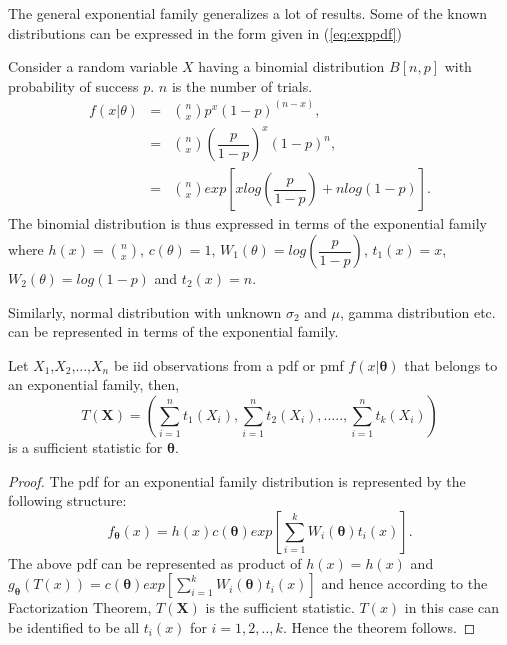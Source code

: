 \documentclass[a4paper,english,12pt]{article}
\newcommand{\bX}{\mathbf{X}}
\newcommand{\btheta}{\boldsymbol{\theta}}
\begin{document}
 The general exponential family generalizes a lot of results. Some of the known distributions can be expressed in the form given in (\ref{eq:exppdf})
 
\begin{exmp}
\par Consider a random variable $X$ having a binomial distribution $B[n,p]$ with probability of success $p$. $n$ is the number of trials. 
\begin{eqnarray}
f(x|\theta) &=& \binom{n}{x}p^{x}(1-p)^{(n-x)},\nonumber \\
&=& \binom{n}{x}\left(\dfrac{p}{1-p}\right)^x(1-p)^n,\nonumber \\
&=& \binom{n}{x}exp\left[x log\left(\dfrac{p}{1-p}\right) + n log(1-p)\right].
\end{eqnarray}
 The binomial distribution is thus expressed in terms of the exponential family where $h(x) = \binom{n}{x}$, $c(\theta) = 1$, $W_1(\theta) = log\left(\dfrac{p}{1-p}\right)$, $t_1(x) = x$, $W_2(\theta) = log(1-p)$ and $t_2(x) = n$.
\end {exmp}
Similarly, normal distribution with unknown $\sigma_2$ and $\mu$, gamma distribution etc. can be represented in terms of the exponential family.
 
\begin{thm}
Let $X_1$,$X_2$,...,$X_n$ be iid observations from a pdf or pmf $f(x|\btheta)$ that belongs to an exponential family, then, 
\begin{equation}
T(\bX) = \left(\sum_{i=1}^{n}t_1(X_i), \sum_{i=1}^{n}t_2(X_i),.....,\sum_{i=1}^{n}t_k(X_i)\right)
\end{equation}
is a sufficient statistic for $\btheta$.
\end{thm}

\begin{proof}
The pdf for an exponential family distribution is represented by the following structure:
\begin{equation}
f_{\btheta}(x) = h(x)c(\btheta)exp\left[\sum_{i=1}^{k} W_i(\btheta)t_i(x)\right].
\end{equation}
The above pdf can be represented as product of $h(x) = h(x)$ and $g_{\btheta}(T(x)) = c(\btheta)exp\left[\sum_{i=1}^{k} W_i(\btheta)t_i(x)\right]$ and hence according to the Factorization Theorem, $T(\bX)$ is the sufficient statistic. $T(x)$ in this case can be identified to be all $t_i(x)$ for $i=1,2,..,k$. Hence the theorem follows.
\end{proof}
\end{document}
